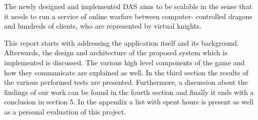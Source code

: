 \documentclass{article}
\begin{document}
The newly designed and implemented DAS aims to be scalable in the sense that it needs to run a service of online warfare between computer- controlled dragons and hundreds of clients, who are represented by virtual knights. %

This report starts with addressing the application itself and its background.
Afterwards, the design and architecture of the proposed system which is implemented is discussed.
The various high level components of the game and how they communicate are explained as well.
In the third section the results of the various performed tests are presented. 
Furthermore, a discussion about the findings of our work can be found in the fourth section and finally it ends with a conclusion in section 5. In the appendix a list with spent hours is present as well as a personal evaluation of this project.

\newpage









  


\end{document}
